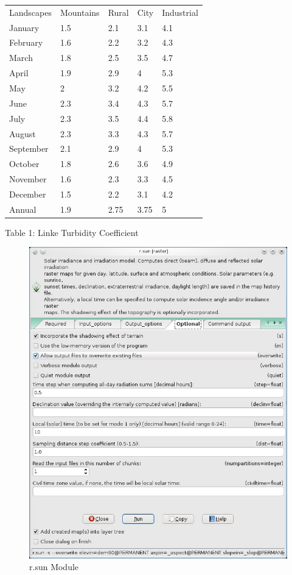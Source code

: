 \begin{center}
\begin{tabular}{lllll}
Landscapes & Mountains & Rural & City & Industrial\\
January & 1.5 & 2.1 & 3.1 & 4.1\\
February & 1.6 & 2.2 & 3.2 & 4.3\\
March & 1.8 & 2.5 & 3.5 & 4.7\\
April & 1.9 & 2.9 & 4 & 5.3\\
May & 2 & 3.2 & 4.2 & 5.5\\
June & 2.3 & 3.4 & 4.3 & 5.7\\
July & 2.3 & 3.5 & 4.4 & 5.8\\
August & 2.3 & 3.3 & 4.3 & 5.7\\
September & 2.1 & 2.9 & 4 & 5.3\\
October & 1.8 & 2.6 & 3.6 & 4.9\\
November & 1.6 & 2.3 & 3.3 & 4.5\\
December & 1.5 & 2.2 & 3.1 & 4.2\\
Annual & 1.9 & 2.75 & 3.75 & 5
\end{tabular}
\linebreak
Table 1: Linke Turbidity Coefficient
\end{center}

\begin{figure}[htbp]
   \centering
   \includegraphics[scale=0.4]{gipe024.png}
   \caption{r.sun Module}
   \label{fig:gipe024}
\end{figure}

